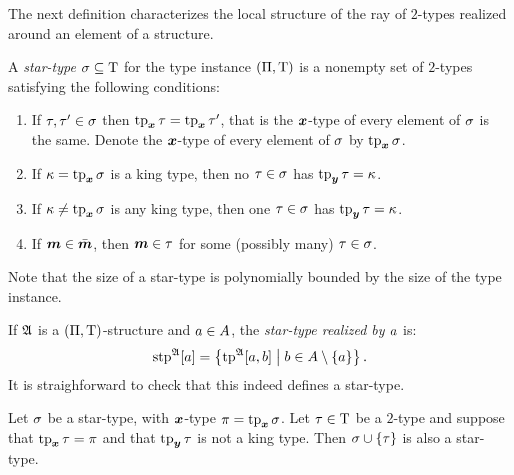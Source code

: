 The next definition characterizes the local structure of the ray of $2$-types
realized around an element of a structure.
\begin{definition}
A \emph{star-type} $\sigma \subseteq \mathrm{T}$ for the type instance
$(\Pi,\mathrm{T})$ is a nonempty set of $2$-types satisfying the following conditions:
\begin{enumerate}
  \item\label{cond:star-1} If $\tau, {\tau'} \in \sigma$ then $\operatorname{tp}_{\bm{x}}\tau =
  \operatorname{tp}_{\bm{x}}{\tau'}$, that is the $\bm{x}$-type of every element of $\sigma$ is the same.
  Denote the $\bm{x}$-type of every element of $\sigma$ by $\operatorname{tp}_{\bm{x}}\sigma$.
  \item\label{cond:star-2} If $\kappa = \operatorname{tp}_{\bm{x}}\sigma$ is a king type, then no $\tau
  \in \sigma$ has $\operatorname{tp}_{\bm{y}}\tau = \kappa$.
  \item\label{cond:star-3} If $\kappa \neq \operatorname{tp}_{\bm{x}}\sigma$ is any king type, then one
  $\tau \in \sigma$ has $\operatorname{tp}_{\bm{y}}\tau = \kappa$.
  \item\label{cond:star-4} If $\bm{m} \in \bar{\bm{m}}$, then $\bm{m} \in \tau$ for some
  (possibly many) $\tau \in \sigma$.
\end{enumerate}
Note that the size of a star-type is polynomially bounded by the size of the
type instance.

If $\mathfrak{A}$ is a $(\Pi,\mathrm{T})$-structure and $a \in A$, the
\emph{star-type realized by $a$} is:
\[
  \operatorname{stp}^{\mathfrak{A}}[a] = \left\{\operatorname{tp}^{\mathfrak{A}}[a,b]\mathrel{}\middle|\mathrel{}b \in A \setminus \left\{a\right\}\right\}.
\]
It is straighforward to check that this indeed defines a star-type.
\end{definition}

\begin{remark}\label{rem:star-type-ext}
Let $\sigma$ be a star-type, with $\bm{x}$-type $\pi = \operatorname{tp}_{\bm{x}}\sigma$.
Let $\tau \in \mathrm{T}$ be a $2$-type and suppose that $\operatorname{tp}_{\bm{x}}\tau = \pi$ and
that $\operatorname{tp}_{\bm{y}}\tau$ is not a king type.
Then $\sigma \cup \left\{\tau\right\}$ is also a star-type.
\end{remark}

